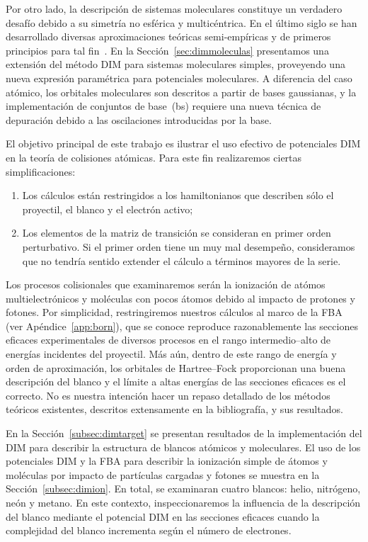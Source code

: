Por otro lado, la descripción de sistemas moleculares constituye un 
verdadero desafío debido a su simetría no esférica y multicéntrica. En 
el último siglo se han desarrollado diversas aproximaciones teóricas 
semi-empíricas y de primeros principios para tal fin~\cite{Szabo:96,
Helgaker:00,Schaefer:04}. En la Sección~\ref{sec:dimmoleculas} 
presentamos una extensión del método DIM para sistemas moleculares 
simples, proveyendo una nueva expresión paramétrica para potenciales 
moleculares. A diferencia del caso atómico, los orbitales moleculares 
son descritos a partir de bases gaussianas, y la implementación de 
conjuntos de base~(\acs{bs}) requiere una nueva técnica de depuración 
debido a las oscilaciones introducidas por la base. 

El objetivo  principal de este trabajo es ilustrar el uso efectivo de potenciales DIM en la teoría de colisiones atómicas. Para este fin realizaremos ciertas simplificaciones: 
\begin{enumerate}
\item Los cálculos están restringidos a los hamiltonianos que describen
sólo el proyectil, el blanco y el electrón activo;
\item Los elementos de la matriz de transición se consideran en primer 
orden perturbativo. Si el primer orden tiene un muy mal desempeño, 
consideramos que no tendría sentido extender el cálculo a términos 
mayores de la serie. 
\end{enumerate}
Los procesos colisionales que examinaremos serán la ionización de atómos 
multielectrónicos y moléculas con pocos átomos debido al impacto de 
protones y fotones. Por simplicidad, restringiremos nuestros cálculos 
al marco de la FBA (ver Apéndice~\ref{app:born}), que se conoce  
reproduce razonablemente las secciones eficaces experimentales de 
diversos procesos en el rango intermedio--alto de energías incidentes 
del proyectil. Más aún, dentro de este rango de energía y orden de 
aproximación, los orbitales de Hartree--Fock proporcionan una buena 
descripción del blanco y el límite a altas energías de las secciones 
eficaces es el correcto. No es nuestra intención hacer un repaso 
detallado de los métodos teóricos existentes, descritos extensamente en 
la bibliografía, y sus resultados. 

En la Sección~\ref{subsec:dimtarget} se presentan resultados de la  
implementación del DIM para describir la estructura de blancos atómicos 
y moleculares. El uso de los potenciales DIM y la FBA para describir la 
ionización simple de átomos y moléculas por impacto de partículas 
cargadas y fotones se muestra en la Sección~\ref{subsec:dimion}.
En total, se examinaran cuatro blancos: helio, nitrógeno, neón y metano. 
En este contexto, inspeccionaremos la influencia de la descripción del 
blanco mediante el potencial DIM en las secciones eficaces cuando la 
complejidad del blanco incrementa según el número de electrones.

